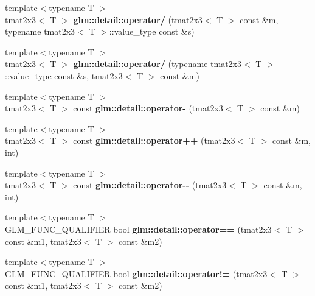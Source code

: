 \begin{DoxyCompactItemize}
\item 
\hypertarget{namespaceglm_1_1detail_a4697925a500fd05aee8ad76f0b5e499f}{{\footnotesize template$<$typename T $>$ }\\tmat2x3$<$ \-T $>$ {\bfseries glm\-::detail\-::operator/} (tmat2x3$<$ \-T $>$ const \&m, typename tmat2x3$<$ \-T $>$\-::value\-\_\-type const \&s)}\label{namespaceglm_1_1detail_a4697925a500fd05aee8ad76f0b5e499f}

\item 
\hypertarget{namespaceglm_1_1detail_af89b9a17fce17b31e79f98f019a618c4}{{\footnotesize template$<$typename T $>$ }\\tmat2x3$<$ \-T $>$ {\bfseries glm\-::detail\-::operator/} (typename tmat2x3$<$ \-T $>$\-::value\-\_\-type const \&s, tmat2x3$<$ \-T $>$ const \&m)}\label{namespaceglm_1_1detail_af89b9a17fce17b31e79f98f019a618c4}

\item 
\hypertarget{namespaceglm_1_1detail_a82f934e87401e990a5b59d2375abeafe}{{\footnotesize template$<$typename T $>$ }\\tmat2x3$<$ \-T $>$ const {\bfseries glm\-::detail\-::operator-\/} (tmat2x3$<$ \-T $>$ const \&m)}\label{namespaceglm_1_1detail_a82f934e87401e990a5b59d2375abeafe}

\item 
\hypertarget{namespaceglm_1_1detail_a825442cc11a3b10ac13803149a20f7a5}{{\footnotesize template$<$typename T $>$ }\\tmat2x3$<$ \-T $>$ const {\bfseries glm\-::detail\-::operator++} (tmat2x3$<$ \-T $>$ const \&m, int)}\label{namespaceglm_1_1detail_a825442cc11a3b10ac13803149a20f7a5}

\item 
\hypertarget{namespaceglm_1_1detail_a39c8ba5526d07d257d1f16b171e2745b}{{\footnotesize template$<$typename T $>$ }\\tmat2x3$<$ \-T $>$ const {\bfseries glm\-::detail\-::operator-\/-\/} (tmat2x3$<$ \-T $>$ const \&m, int)}\label{namespaceglm_1_1detail_a39c8ba5526d07d257d1f16b171e2745b}

\item 
\hypertarget{namespaceglm_1_1detail_ada047383848239b91e1adb9eda99b519}{{\footnotesize template$<$typename T $>$ }\\\-G\-L\-M\-\_\-\-F\-U\-N\-C\-\_\-\-Q\-U\-A\-L\-I\-F\-I\-E\-R bool {\bfseries glm\-::detail\-::operator==} (tmat2x3$<$ \-T $>$ const \&m1, tmat2x3$<$ \-T $>$ const \&m2)}\label{namespaceglm_1_1detail_ada047383848239b91e1adb9eda99b519}

\item 
\hypertarget{namespaceglm_1_1detail_a1d115764911dd070526a224c2f6a1311}{{\footnotesize template$<$typename T $>$ }\\\-G\-L\-M\-\_\-\-F\-U\-N\-C\-\_\-\-Q\-U\-A\-L\-I\-F\-I\-E\-R bool {\bfseries glm\-::detail\-::operator!=} (tmat2x3$<$ \-T $>$ const \&m1, tmat2x3$<$ \-T $>$ const \&m2)}\label{namespaceglm_1_1detail_a1d115764911dd070526a224c2f6a1311}

\end{DoxyCompactItemize}


